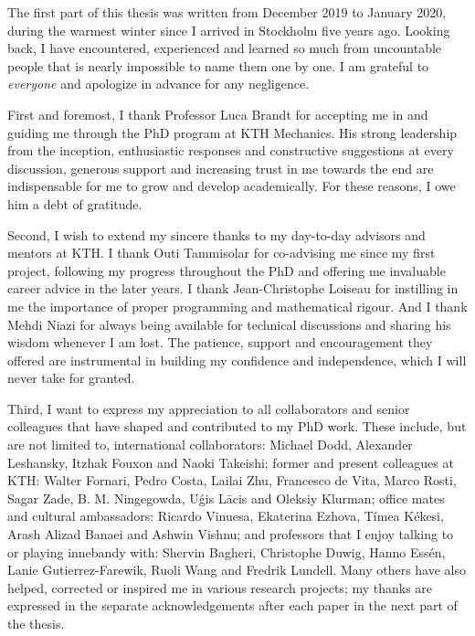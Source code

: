 \begin{acknowledgements}

  The first part of this thesis was written from December 2019 to January 2020, during the warmest winter since I arrived in Stockholm five years ago.
  Looking back, I have encountered, experienced and learned so much from uncountable people that is nearly impossible to name them one by one.
  I am grateful to \emph{everyone} and apologize in advance for any negligence.

  First and foremost, I thank Professor Luca Brandt for accepting me in and guiding me through the PhD program at KTH Mechanics.
  His strong leadership from the inception,
  enthusiastic responses and constructive suggestions at every discussion,
  generous support and increasing trust in me towards the end are indispensable for me to grow and develop academically.
  For these reasons, I owe him a debt of gratitude.

  Second, I wish to extend my sincere thanks to my day-to-day advisors and mentors at KTH.
  I thank Outi Tammisolar for co-advising me since my first project, following my progress throughout the PhD
  and offering me invaluable career advice in the later years.
  I thank Jean-Christophe Loiseau for instilling in me the importance of proper programming and mathematical rigour.
  And I thank Mehdi Niazi for always being available for technical discussions and sharing his wisdom whenever I am lost.
  The patience, support and encouragement they offered are instrumental in building my confidence and independence, which I will never take for granted.

  Third, I want to express my appreciation to all collaborators and senior colleagues that have shaped and contributed to my PhD work.
  These include, but are not limited to, international collaborators: Michael Dodd, Alexander Leshansky, Itzhak Fouxon and Naoki Takeishi;
  former and present colleagues at KTH: Walter Fornari, Pedro Costa, Lailai Zhu, Francesco de Vita, Marco Rosti, Sagar Zade, B. M. Ningegowda, U\'{g}is L\={a}cis and Oleksiy Klurman;
  office mates and cultural ambassadors: Ricardo Vinuesa, Ekaterina Ezhova, Tímea Kékesi, Arash Alizad Banaei and Ashwin Vishnu;
  and professors that I enjoy talking to or playing innebandy with:
  Shervin Bagheri, Christophe Duwig, Hanno Essén, Lanie Gutierrez-Farewik, Ruoli Wang and Fredrik Lundell.
  Many others have also helped, corrected or inspired me in various research projects;
  my thanks are expressed in the separate acknowledgements after each paper in the next part of the thesis.
  

\end{acknowledgements}
